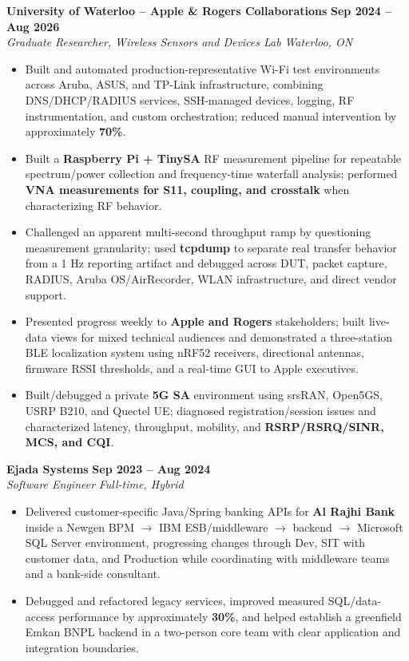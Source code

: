 \documentclass[letterpaper,10pt]{article}
\newcommand{\role}[4]{\textbf{#1} \hfill \textbf{#2} \\
\textit{#3} \hfill \textit{#4} \\
}
\newcommand{\tight}{\vspace{-2pt}}
\begin{document}
\role{University of Waterloo -- Apple \& Rogers Collaborations}{Sep 2024 -- Aug 2026}{Graduate Researcher, Wireless Sensors and Devices Lab}{Waterloo, ON}
\begin{itemize}
  \item Built and automated production-representative Wi-Fi test environments across Aruba, ASUS, and TP-Link infrastructure, combining DNS/DHCP/RADIUS services, SSH-managed devices, logging, RF instrumentation, and custom orchestration; reduced manual intervention by approximately \textbf{70\%}.
  \item Built a \textbf{Raspberry Pi + TinySA} RF measurement pipeline for repeatable spectrum/power collection and frequency-time waterfall analysis; performed \textbf{VNA measurements for S11, coupling, and crosstalk} when characterizing RF behavior.
  \item Challenged an apparent multi-second throughput ramp by questioning measurement granularity; used \textbf{tcpdump} to separate real transfer behavior from a 1 Hz reporting artifact and debugged across DUT, packet capture, RADIUS, Aruba OS/AirRecorder, WLAN infrastructure, and direct vendor support.
  \item Presented progress weekly to \textbf{Apple and Rogers} stakeholders; built live-data views for mixed technical audiences and demonstrated a three-station BLE localization system using nRF52 receivers, directional antennas, firmware RSSI thresholds, and a real-time GUI to Apple executives.
  \item Built/debugged a private \textbf{5G SA} environment using srsRAN, Open5GS, USRP B210, and Quectel UE; diagnosed registration/session issues and characterized latency, throughput, mobility, and \textbf{RSRP/RSRQ/SINR, MCS, and CQI}.
\end{itemize}
\tight

\newpage
\role{Ejada Systems}{Sep 2023 -- Aug 2024}{Software Engineer}{Full-time, Hybrid}
\begin{itemize}
  \item Delivered customer-specific Java/Spring banking APIs for \textbf{Al Rajhi Bank} inside a Newgen BPM $\rightarrow$ IBM ESB/middleware $\rightarrow$ backend $\rightarrow$ Microsoft SQL Server environment, progressing changes through Dev, SIT with customer data, and Production while coordinating with middleware teams and a bank-side consultant.
  \item Debugged and refactored legacy services, improved measured SQL/data-access performance by approximately \textbf{30\%}, and helped establish a greenfield Emkan BNPL backend in a two-person core team with clear application and integration boundaries.
\end{itemize}
\end{document}
